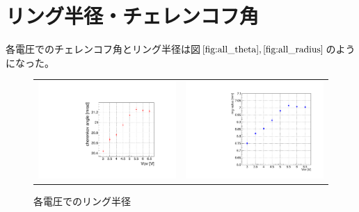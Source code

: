 \documentclass[uplatex, titlepage, dvipdfmx, 12pt, a4paper]{jsreport}
\begin{document}

  \section{リング半径・チェレンコフ角}
    各電圧でのチェレンコフ角とリング半径は図$\ref{fig:all_theta}, \ref{fig:all_radius}$のようになった。
    \begin{figure}[hbtp]
      \begin{tabular}{cc}
        \begin{minipage}[t]{0.45\hsize}
          \centering
          \includegraphics[scale=0.4, clip]{image/theta_allV.pdf}
          \caption{各電圧でのチェレンコフ角} 
          \label{fig:all_theta} 
        \end{minipage} &
        \begin{minipage}[t]{0.45\hsize}
          \centering
          \includegraphics[scale=0.3, clip]{image/all_radius.pdf}
          \caption{各電圧でのリング半径} 
          \label{fig:all_radius} 
        \end{minipage}
      \end{tabular}
    \end{figure}
\end{document}
